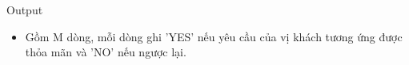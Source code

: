 Output  
\begin{itemize}
	\item     Gồm M dòng, mỗi dòng ghi 'YES' nếu yêu cầu của vị khách tương ứng được thỏa mãn và 'NO' nếu ngược lại.   
\end{itemize}